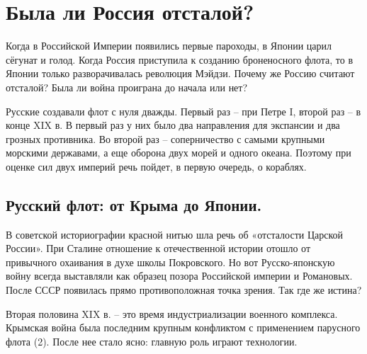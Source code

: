 
\chapter{Была ли Россия отсталой?}

Когда в Российской Империи появились первые пароходы, в Японии царил сёгунат и голод. Когда Россия приступила к созданию броненосного флота, то в Японии только разворачивалась революция Мэйдзи. Почему же Россию считают отсталой? Была ли война проиграна до начала или нет?

Русские создавали флот с нуля дважды. Первый раз – при Петре I, второй раз – в конце XIX в. В первый раз у них было два направления для экспансии и два грозных противника. Во второй раз – соперничество с самыми крупными морскими державами, а еще оборона двух морей и одного океана. Поэтому при оценке сил двух империй речь пойдет, в первую очередь, о кораблях. 

\section{Русский флот: от Крыма до Японии.}

В советской историографии красной нитью шла речь об «отсталости Царской России». При Сталине отношение к отечественной истории отошло от привычного охаивания в духе школы Покровского. Но вот Русско-японскую войну всегда выставляли как образец позора Российской империи и Романовых. После СССР появилась прямо противоположная точка зрения. Так где же истина?

Вторая половина XIX в. – это время индустриализации военного комплекса. Крымская война была последним крупным конфликтом с применением парусного флота (2). После нее стало ясно: главную роль играют технологии.

